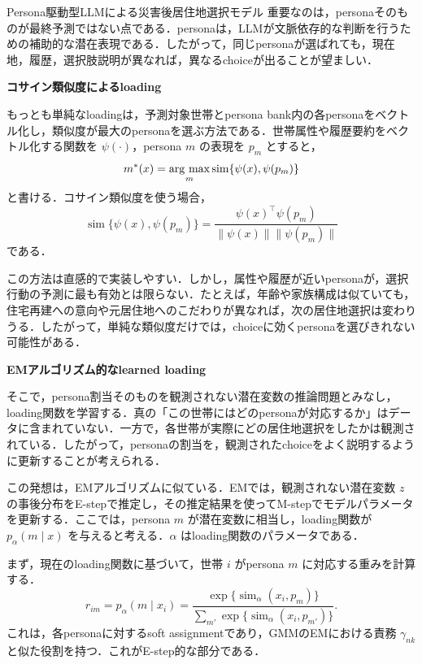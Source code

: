 \begin{column}{Persona駆動型LLMによる災害後居住地選択モデル}
重要なのは，personaそのものが最終予測ではない点である．personaは，LLMが文脈依存的な判断を行うための補助的な潜在表現である．したがって，同じpersonaが選ばれても，現在地，履歴，選択肢説明が異なれば，異なるchoiceが出ることが望ましい．

\medskip
\noindent
\textbf{コサイン類似度によるloading}

もっとも単純なloadingは，予測対象世帯とpersona bank内の各personaをベクトル化し，類似度が最大のpersonaを選ぶ方法である．世帯属性や履歴要約をベクトル化する関数を \(\psi(\cdot)\)，persona \(m\) の表現を \(p_m\) とすると，
\begin{equation}
m^*(x)
=
\mathop{\rm arg~max}\limits_m
\operatorname{sim}\{\psi(x),\psi(p_m)\}
\end{equation}
と書ける．コサイン類似度を使う場合，
\begin{equation}
\operatorname{sim}\{\psi(x),\psi(p_m)\}
=
\frac{\psi(x)^\top \psi(p_m)}
{\|\psi(x)\|\|\psi(p_m)\|}
\end{equation}
である．

この方法は直感的で実装しやすい．しかし，属性や履歴が近いpersonaが，選択行動の予測に最も有効とは限らない．たとえば，年齢や家族構成は似ていても，住宅再建への意向や元居住地へのこだわりが異なれば，次の居住地選択は変わりうる．したがって，単純な類似度だけでは，choiceに効くpersonaを選びきれない可能性がある．

\medskip
\noindent
\textbf{EMアルゴリズム的なlearned loading}

そこで，persona割当そのものを観測されない潜在変数の推論問題とみなし，loading関数を学習する．真の「この世帯にはどのpersonaが対応するか」はデータに含まれていない．一方で，各世帯が実際にどの居住地選択をしたかは観測されている．したがって，personaの割当を，観測されたchoiceをよく説明するように更新することが考えられる．

この発想は，EMアルゴリズムに似ている．EMでは，観測されない潜在変数 \(z\) の事後分布をE-stepで推定し，その推定結果を使ってM-stepでモデルパラメータを更新する．ここでは，persona \(m\) が潜在変数に相当し，loading関数が \(p_\alpha(m\mid x)\) を与えると考える．\(\alpha\) はloading関数のパラメータである．

まず，現在のloading関数に基づいて，世帯 \(i\) がpersona \(m\) に対応する重みを計算する．
\begin{equation}
r_{im}
=
p_\alpha(m\mid x_i)
=
\frac{\exp\{\operatorname{sim}_\alpha(x_i,p_m)\}}
{\sum_{m'}\exp\{\operatorname{sim}_\alpha(x_i,p_{m'})\}}.
\end{equation}
これは，各personaに対するsoft assignmentであり，GMMのEMにおける責務 \(\gamma_{nk}\) と似た役割を持つ．これがE-step的な部分である．


\end{column}
